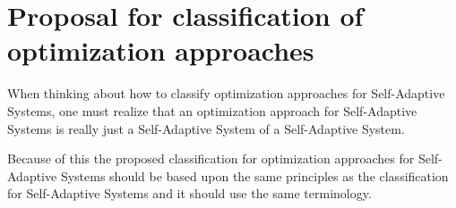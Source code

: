 \newpage
\section{Proposal for classification of optimization approaches}
\label{ch:Proposal}





When thinking about how to classify optimization approaches for Self-Adaptive Systems,
one must realize that an optimization approach for Self-Adaptive Systems is really just
a Self-Adaptive System of a Self-Adaptive System.

Because of this the proposed classification for optimization approaches for Self-Adaptive Systems
should be based upon the same principles as the classification for Self-Adaptive Systems
and it should use the same terminology.

